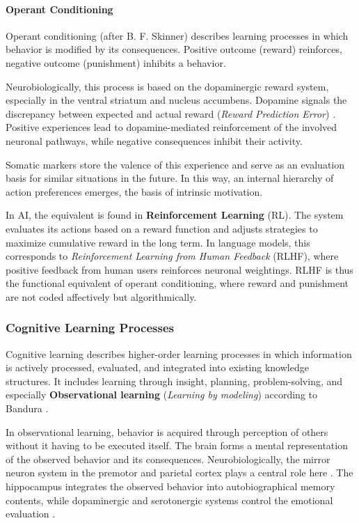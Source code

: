 \paragraph{Operant Conditioning}
Operant conditioning (after B. F. Skinner) describes learning processes in which behavior is modified by its consequences. Positive outcome (reward) reinforces, negative outcome (punishment) inhibits a behavior.

Neurobiologically, this process is based on the dopaminergic reward system, especially in the ventral striatum and nucleus accumbens. Dopamine signals the discrepancy between expected and actual reward (\emph{Reward Prediction Error}) \cite{Schultz1997, Berridge1998}. Positive experiences lead to dopamine-mediated reinforcement of the involved neuronal pathways, while negative consequences inhibit their activity.

Somatic markers store the valence of this experience and serve as an evaluation basis for similar situations in the future. In this way, an internal hierarchy of action preferences emerges, the basis of intrinsic motivation.

In AI, the equivalent is found in \textbf{Reinforcement Learning} (RL). The system evaluates its actions based on a reward function and adjusts strategies to maximize cumulative reward in the long term. In language models, this corresponds to \emph{Reinforcement Learning from Human Feedback} (RLHF), where positive feedback from human users reinforces neuronal weightings. RLHF is thus the functional equivalent of operant conditioning, where reward and punishment are not coded affectively but algorithmically.

\subsubsection*{Cognitive Learning Processes}

Cognitive learning describes higher-order learning processes in which information is actively processed, evaluated, and integrated into existing knowledge structures. It includes learning through insight, planning, problem-solving, and especially \textbf{Observational learning} (\emph{Learning by modeling}) according to Bandura \cite{Bandura1977}.

In observational learning, behavior is acquired through perception of others without it having to be executed itself. The brain forms a mental representation of the observed behavior and its consequences. Neurobiologically, the mirror neuron system in the premotor and parietal cortex plays a central role here \cite{Rizzolatti2004}. The hippocampus integrates the observed behavior into autobiographical memory contents, while dopaminergic and serotonergic systems control the emotional evaluation \cite{Iacoboni2009}.

